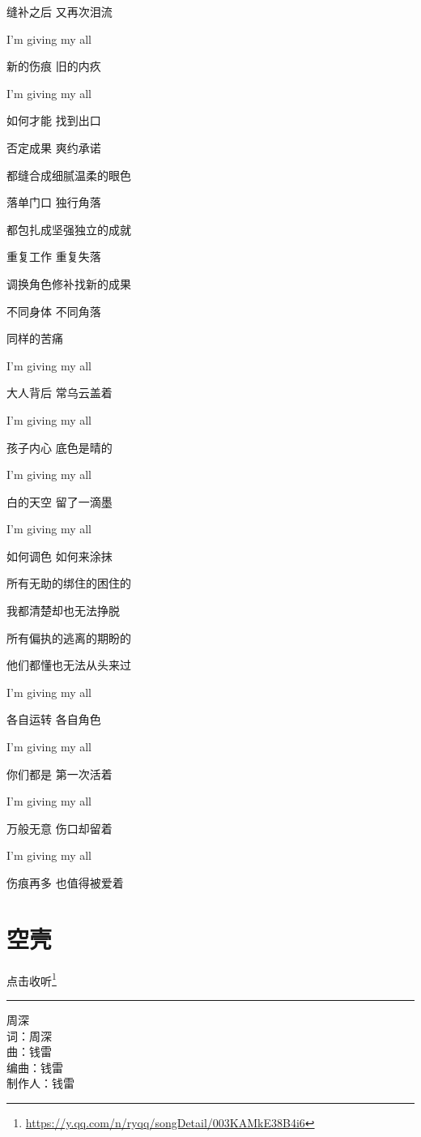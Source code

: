 \documentclass[]{ctexbook}
\renewcommand{\href}[2]{#2\footnote{\url{#1}}}
\begin{document}
缝补之后 又再次泪流

I'm giving my all

新的伤痕 旧的内疚

I'm giving my all

如何才能 找到出口

否定成果 爽约承诺

都缝合成细腻温柔的眼色

落单门口 独行角落

都包扎成坚强独立的成就

重复工作 重复失落

调换角色修补找新的成果

不同身体 不同角落

同样的苦痛

I'm giving my all

大人背后 常乌云盖着

I'm giving my all

孩子内心 底色是晴的

I'm giving my all

白的天空 留了一滴墨

I'm giving my all

如何调色 如何来涂抹

所有无助的绑住的困住的

我都清楚却也无法挣脱

所有偏执的逃离的期盼的

他们都懂也无法从头来过

I'm giving my all

各自运转 各自角色

I'm giving my all

你们都是 第一次活着

I'm giving my all

万般无意 伤口却留着

I'm giving my all

伤痕再多 也值得被爱着

\section*{空壳}\label{shen}


\href{https://y.qq.com/n/ryqq/songDetail/003KAMkE38B4i6}{点击收听}

\begin{center}\rule{0.5\linewidth}{0.5pt}\end{center}

周深\\
词：周深\\
曲：钱雷\\
编曲：钱雷\\
制作人：钱雷
\end{document}
